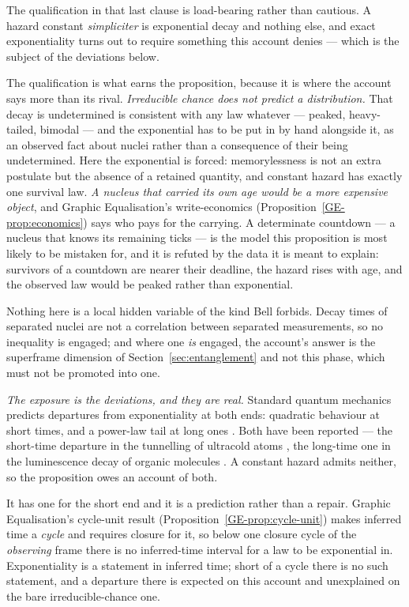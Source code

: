 \documentclass[11pt,a4paper]{article}
\theoremstyle{remark}\newtheorem{remark}[definition]{Remark}
\begin{document}
The qualification in that last clause is load-bearing rather than cautious. A hazard constant
\emph{simpliciter} is exponential decay and nothing else, and exact exponentiality turns out to
require something this account denies --- which is the subject of the deviations below.

The qualification is what earns the proposition, because it is where the account says more than its
rival. \emph{Irreducible chance does not predict a distribution.} That decay is undetermined is
consistent with any law whatever --- peaked, heavy-tailed, bimodal --- and the exponential has to be
put in by hand alongside it, as an observed fact about nuclei rather than a consequence of their
being undetermined. Here the exponential is forced: memorylessness is not an extra postulate but the
absence of a retained quantity, and constant hazard has exactly one survival law. \emph{A nucleus
that carried its own age would be a more expensive object}, and Graphic Equalisation's
write-economics (Proposition~\ref{GE-prop:economics}) says who pays for the carrying. A determinate countdown --- a nucleus that knows its remaining ticks --- is the
model this proposition is most likely to be mistaken for, and it is refuted by the data it is meant
to explain: survivors of a countdown are nearer their deadline, the hazard rises with age, and the
observed law would be peaked rather than exponential.

Nothing here is a local hidden variable of the kind Bell forbids. Decay times of separated nuclei
are not a correlation between separated measurements, so no inequality is engaged; and where one
\emph{is} engaged, the account's answer is the superframe dimension of
Section~\ref{sec:entanglement} and not this phase, which must not be promoted into one.

\emph{The exposure is the deviations, and they are real.} Standard quantum mechanics predicts
departures from exponentiality at both ends: quadratic behaviour at short times, and a power-law
tail at long ones \citep{khalfin1957}. Both have been reported --- the short-time departure in the
tunnelling of ultracold atoms \citep{wilkinson1997}, the long-time one in the luminescence decay of
organic molecules \citep{rothe2006}. A constant hazard admits neither, so the proposition owes an
account of both.

It has one for the short end and it is a prediction rather than a repair.
Graphic Equalisation's cycle-unit result (Proposition~\ref{GE-prop:cycle-unit}) makes inferred time a
\emph{cycle} and requires closure for it, so
below one closure cycle of the \emph{observing} frame there is no inferred-time interval for a law
to be exponential in. Exponentiality is a statement in inferred time; short of a cycle there is no
such statement, and a departure there is expected on this account and unexplained on the bare
irreducible-chance one.
\end{document}
